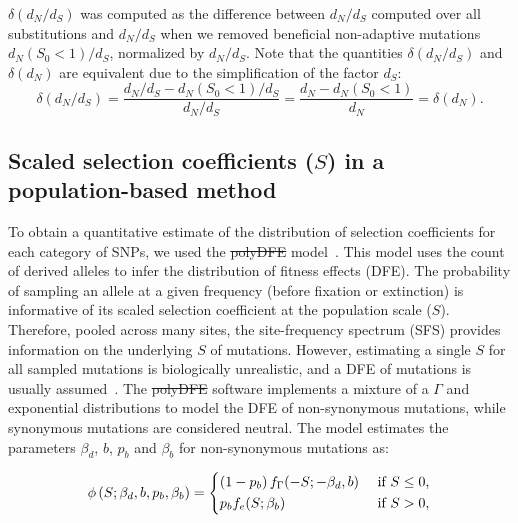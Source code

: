 \documentclass{article}
\newcommand{\dn}{d_N}
\newcommand{\ds}{d_S}
\newcommand{\dnds}{\dn / \ds}
\newcommand{\Sphy}{S_{0}}
\newcommand{\Spop}{S}
\newcommand{\AdvMean}{\beta_b}
\newcommand{\DelMean}{\beta_d}
\providecommand{\DIFaddtex}[1]{{\protect\color{blue}\uwave{#1}}} %
\providecommand{\DIFdeltex}[1]{{\protect\color{red}\sout{#1}}}                      %
\providecommand{\DIFaddbegin}{} %
\providecommand{\DIFaddend}{} %
\providecommand{\DIFdelbegin}{} %
\providecommand{\DIFdelend}{} %
\providecommand{\DIFadd}[1]{\texorpdfstring{\DIFaddtex{#1}}{#1}} %
\providecommand{\DIFdel}[1]{\texorpdfstring{\DIFdeltex{#1}}{}} %
\newcommand{\DIFscaledelfig}{0.5}
\newlength{\DIFdelgraphicswidth} %
\newlength{\DIFdelgraphicsheight} %
\newcommand{\DIFaddincludegraphics}[2][]{{\color{blue}\fbox{\DIFOincludegraphics[#1]{#2}}}} %
\newcommand{\DIFdelincludegraphics}[2][]{%
\sbox{\DIFdelgraphicsbox}{\DIFOincludegraphics[#1]{#2}}%
\settoboxwidth{\DIFdelgraphicswidth}{\DIFdelgraphicsbox} %
\settoboxtotalheight{\DIFdelgraphicsheight}{\DIFdelgraphicsbox} %
\scalebox{\DIFscaledelfig}{%
\parbox[b]{\DIFdelgraphicswidth}{\usebox{\DIFdelgraphicsbox}\\[-\baselineskip] \rule{\DIFdelgraphicswidth}{0em}}\llap{\resizebox{\DIFdelgraphicswidth}{\DIFdelgraphicsheight}{%
\setlength{\unitlength}{\DIFdelgraphicswidth}%
\begin{picture}(1,1)%
\thicklines\linethickness{2pt} %
{\color[rgb]{1,0,0}\put(0,0){\framebox(1,1){}}}%
{\color[rgb]{1,0,0}\put(0,0){\line( 1,1){1}}}%
{\color[rgb]{1,0,0}\put(0,1){\line(1,-1){1}}}%
\end{picture}%
}\hspace*{3pt}}} %
} %
\DeclareRobustCommand{\DIFaddbegin}{\DIFOaddbegin \let\includegraphics\DIFaddincludegraphics} %
\DeclareRobustCommand{\DIFaddend}{\DIFOaddend \let\includegraphics\DIFOincludegraphics} %
\DeclareRobustCommand{\DIFdelbegin}{\DIFOdelbegin \let\includegraphics\DIFdelincludegraphics} %
\DeclareRobustCommand{\DIFdelend}{\DIFOaddend \let\includegraphics\DIFOincludegraphics} %
\begin{document}
    $\delta(\dnds)$ was computed as the difference between $\dnds$ computed over all substitutions and $\dnds$ when we removed beneficial non-adaptive mutations $\dn (\Sphy < 1) / \ds$, normalized by $\dnds$.
    Note that the quantities $\delta(\dnds)$ and $\delta(\dn)$ are equivalent due to the simplification of the factor $\ds$:
    \begin{equation}
        \delta(\dnds) = \dfrac{\dnds - \dn(\Sphy < 1) / \ds}{\dnds} = \dfrac{\dn - \dn(\Sphy < 1)}{\dn} = \delta(\dn).\label{eq:delta-dnds}
    \end{equation}

    \subsection{Scaled selection coefficients ($\Spop$) in a population-based method}
    \label{subsec:s-polymorphism-method}

    To obtain a quantitative estimate of the distribution of selection coefficients for each category of SNPs, we used the \DIFdelbegin \DIFdel{polyDFE }\DIFdelend \DIFaddbegin \textit{\DIFadd{polyDFE}} \DIFaddend model~\cite{tataru_inference_2017, tataru_polydfe_2020}.
    This model uses the count of derived alleles to infer the distribution of fitness effects (DFE).
    The probability of sampling an allele at a given frequency (before fixation or extinction) is informative of its scaled selection coefficient at the population scale ($\Spop$).
    Therefore, pooled across many sites, the site-frequency spectrum (SFS) provides information on the underlying $\Spop$ of mutations.
    However, estimating a single $\Spop$ for all sampled mutations is biologically unrealistic, and a DFE of mutations is usually assumed~\cite{eyre-walker_distribution_2006, eyre-walker_estimating_2009}.
    The \DIFdelbegin \DIFdel{polyDFE}\DIFdelend \DIFaddbegin \textit{\DIFadd{polyDFE}}\DIFaddend \cite{tataru_inference_2017, tataru_polydfe_2020} software implements a mixture of a $\Gamma$ and exponential distributions to model the DFE of non-synonymous mutations, while synonymous mutations are considered neutral.
    The model estimates the parameters $\DelMean$, $b$, $p_b$ and $\AdvMean$ for non-synonymous mutations as:

    \begin{equation}
        \DIFaddbegin \label{eq:parametric-dfe}
        \DIFaddend \phi \left( \Spop; \DelMean , b, p_b, \AdvMean \right) =
        \begin{dcases}
            \left( 1 - p_b \right) f_{\Gamma}(-\Spop; -\DelMean, b) & \text{ if $\Spop \leq 0$,} \\
            p_b f_{e}(\Spop; \AdvMean) & \text{ if $\Spop > 0$,} \\
        \end{dcases}
    \end{equation}
\end{document}
